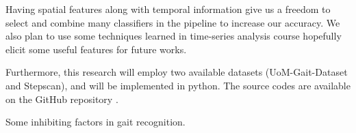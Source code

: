 Having spatial features along with temporal information give us a freedom to select and combine many classifiers in the pipeline to increase our accuracy. We also plan to use some techniques learned in time-series analysis course hopefully elicit some useful features for future works.
 
Furthermore, this research will employ two available datasets (UoM-Gait-Dataset and Stepscan), and will be implemented in python. The source codes are available on the GitHub repository \cite{SKazemii/EE6563}. 

\begin{center}
	\begin{table}[!t]
	\caption{Some inhibiting factors in gait recognition.}
	\label{tab:1_vul}
	\hspace{3em}
	
	\end{table}
\end{center}